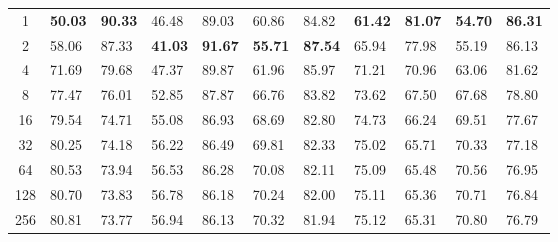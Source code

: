 \documentclass{article}
\begin{document}
\begin{table}[h]
{\begin{tabular}{c|C{0.04\textwidth}C{0.05\textwidth}|C{0.04\textwidth}C{0.05\textwidth}|C{0.04\textwidth}C{0.05\textwidth}|C{0.04\textwidth}C{0.05\textwidth}|C{0.04\textwidth}C{0.05\textwidth}}
1                                     & \textbf{50.03}       & \textbf{90.33}        & 46.48                & 89.03                 & 60.86                & 84.82                 & \textbf{61.42}       & \textbf{81.07}        & \textbf{54.70}       & \textbf{86.31}       \\
2                                     & 58.06                & 87.33                 & \textbf{41.03}       & \textbf{91.67}        & \textbf{55.71}       & \textbf{87.54}        & 65.94                & 77.98                 & 55.19                & 86.13                \\
4                                     & 71.69                & 79.68                 & 47.37                & 89.87                 & 61.96                & 85.97                 & 71.21                & 70.96                 & 63.06                & 81.62                \\
8                                     & 77.47                & 76.01                 & 52.85                & 87.87                 & 66.76                & 83.82                 & 73.62                & 67.50                 & 67.68                & 78.80                \\
16                                    & 79.54                & 74.71                 & 55.08                & 86.93                 & 68.69                & 82.80                 & 74.73                & 66.24                 & 69.51                & 77.67                \\
32                                    & 80.25                & 74.18                 & 56.22                & 86.49                 & 69.81                & 82.33                 & 75.02                & 65.71                 & 70.33                & 77.18                \\
64                                    & 80.53                & 73.94                 & 56.53                & 86.28                 & 70.08                & 82.11                 & 75.09                & 65.48                 & 70.56                & 76.95                \\
128                                   & 80.70                & 73.83                 & 56.78                & 86.18                 & 70.24                & 82.00                 & 75.11                & 65.36                 & 70.71                & 76.84                \\
256                                   & 80.81                & 73.77                 & 56.94                & 86.13                 & 70.32                & 81.94                 & 75.12                & 65.31                 & 70.80                & 76.79                \\

\end{tabular}}
\end{table}
\end{document}
